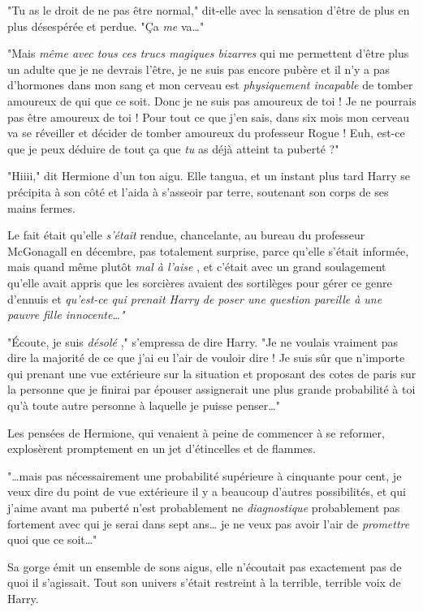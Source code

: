 "Tu as le droit de ne pas être normal," dit-elle avec la sensation d'être de plus en plus désespérée et perdue. "Ça \emph{me}  va…"

"Mais \emph{même avec tous ces trucs magiques bizarres}  qui me permettent d'être plus un adulte que je ne devrais l'être, je ne suis pas encore pubère et il n'y a pas d'hormones dans mon sang et mon cerveau est \emph{physiquement incapable}  de tomber amoureux de qui que ce soit. Donc je ne suis pas amoureux de toi ! Je ne pourrais pas être amoureux de toi ! Pour tout ce que j'en sais, dans six mois mon cerveau va se réveiller et décider de tomber amoureux du professeur Rogue ! Euh, est-ce que je peux déduire de tout ça que \emph{tu}  as déjà atteint ta puberté ?"

"Hiiii," dit Hermione d'un ton aigu. Elle tangua, et un instant plus tard Harry se précipita à son côté et l'aida à s'asseoir par terre, soutenant son corps de ses mains fermes.

Le fait était qu'elle \emph{s'était}  rendue, chancelante, au bureau du professeur McGonagall en décembre, pas totalement surprise, parce qu'elle s'était informée, mais quand même plutôt \emph{mal à l'aise} , et c'était avec un grand soulagement qu'elle avait appris que les sorcières avaient des sortilèges pour gérer ce genre d'ennuis et \emph{qu'est-ce qui prenait Harry de poser une question pareille à une pauvre fille innocente…"} 

"Écoute, je suis \emph{désolé} ," s'empressa de dire Harry. "Je ne voulais vraiment pas dire la majorité de ce que j'ai eu l'air de vouloir dire ! Je suis sûr que n'importe qui prenant une vue extérieure sur la situation et proposant des cotes de paris sur la personne que je finirai par épouser assignerait une plus grande probabilité à toi qu'à toute autre personne à laquelle je puisse penser…"

Les pensées de Hermione, qui venaient à peine de commencer à se reformer, explosèrent promptement en un jet d'étincelles et de flammes.

"…mais pas nécessairement une probabilité supérieure à cinquante pour cent, je veux dire du point de vue extérieure il y a beaucoup d'autres possibilités, et qui j'aime avant ma puberté n'est probablement ne \emph{diagnostique}  probablement pas fortement avec qui je serai dans sept ans… je ne veux pas avoir l'air de \emph{promettre}  quoi que ce soit…"

Sa gorge émit un ensemble de sons aigus, elle n'écoutait pas exactement pas de quoi il s'agissait. Tout son univers s'était restreint à la terrible, terrible voix de Harry.

